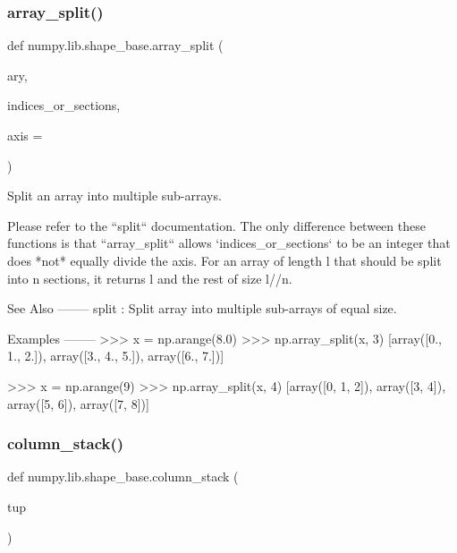 \subsubsection{\texorpdfstring{array\+\_\+split()}{array\_split()}}
{\footnotesize\ttfamily def numpy.\+lib.\+shape\+\_\+base.\+array\+\_\+split (\begin{DoxyParamCaption}\item[{}]{ary,  }\item[{}]{indices\+\_\+or\+\_\+sections,  }\item[{}]{axis = {} }\end{DoxyParamCaption})}

\begin{DoxyVerb}Split an array into multiple sub-arrays.

Please refer to the ``split`` documentation.  The only difference
between these functions is that ``array_split`` allows
`indices_or_sections` to be an integer that does *not* equally
divide the axis. For an array of length l that should be split
into n sections, it returns l %
and the rest of size l//n.

See Also
--------
split : Split array into multiple sub-arrays of equal size.

Examples
--------
>>> x = np.arange(8.0)
>>> np.array_split(x, 3)
[array([0.,  1.,  2.]), array([3.,  4.,  5.]), array([6.,  7.])]

>>> x = np.arange(9)
>>> np.array_split(x, 4)
[array([0, 1, 2]), array([3, 4]), array([5, 6]), array([7, 8])]\end{DoxyVerb}
 \mbox{\label{namespacenumpy_1_1lib_1_1shape__base_a223be1f5270e217c41528fbec2131c43}} 
\subsubsection{\texorpdfstring{column\+\_\+stack()}{column\_stack()}}
{\footnotesize\ttfamily def numpy.\+lib.\+shape\+\_\+base.\+column\+\_\+stack (\begin{DoxyParamCaption}\item[{}]{tup }\end{DoxyParamCaption})}


